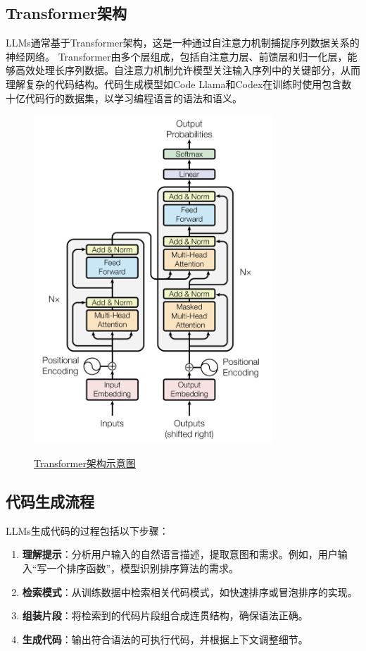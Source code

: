 \documentclass[11pt]{article}
\begin{document}
\subsection{Transformer架构}
LLMs通常基于Transformer架构，这是一种通过自注意力机制捕捉序列数据关系的神经网络。%
Transformer由多个层组成，包括自注意力层、前馈层和归一化层，能够高效处理长序列数据。自注意力机制允许模型关注输入序列中的关键部分，从而理解复杂的代码结构。代码生成模型如Code Llama和Codex在训练时使用包含数十亿代码行的数据集，以学习编程语言的语法和语义。

\begin{figure}[H]
    \centering
    \href{https://papers.nips.cc/paper_files/paper/2017/file/3f5ee243547dee91fbd053c1c4a845aa-Paper.pdf}{%
        \includegraphics[width=0.8\textwidth]{transformer_architecture.png}%
    }
    \caption{\href{https://papers.nips.cc/paper_files/paper/2017/file/3f5ee243547dee91fbd053c1c4a845aa-Paper.pdf}{Transformer架构示意图}}%
    \label{fig:transformer}
\end{figure}

\subsection{代码生成流程}
LLMs生成代码的过程包括以下步骤：
\begin{enumerate}
    \item \textbf{理解提示}：分析用户输入的自然语言描述，提取意图和需求。例如，用户输入“写一个排序函数”，模型识别排序算法的需求。
    \item \textbf{检索模式}：从训练数据中检索相关代码模式，如快速排序或冒泡排序的实现。
    \item \textbf{组装片段}：将检索到的代码片段组合成连贯结构，确保语法正确。
    \item \textbf{生成代码}：输出符合语法的可执行代码，并根据上下文调整细节。
\end{enumerate}
\end{document}
